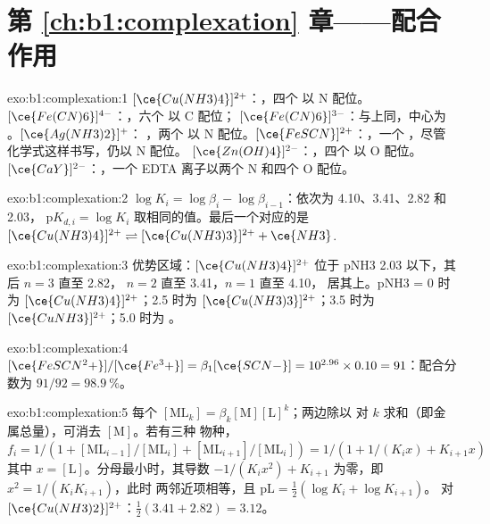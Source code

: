 \section*{第 \ref{ch:b1:complexation} 章——配合作用}

\begin{solution}{exo:b1:complexation:1}
$[\ce{Cu(NH3)4}]^{2+}$：，四个  以 N 配位。
$[\ce{Fe(CN)6}]^{4-}$：，六个  以 C 配位；
$[\ce{Fe(CN)6}]^{3-}$：与上同，中心为 。$[\ce{Ag(NH3)2}]^{+}$：
，两个  以 N 配位。$[\ce{FeSCN}]^{2+}$：，一个
，尽管化学式这样书写，仍以 N 配位。
$[\ce{Zn(OH)4}]^{2-}$：，四个  以 O 配位。
$[\ce{CaY}]^{2-}$：，一个 EDTA 离子以两个 N 和四个 O 配位。
\end{solution}

\begin{solution}{exo:b1:complexation:2}
$\log K_i = \log\beta_i - \log\beta_{i-1}$：依次为 4.10、3.41、2.82 和 2.03，
$\mathrm{p}K_{d,i} = \log K_i$ 取相同的值。最后一个对应的是
$[\ce{Cu(NH3)4}]^{2+} \rightleftharpoons [\ce{Cu(NH3)3}]^{2+} + \ce{NH3}$.
\end{solution}

\begin{solution}{exo:b1:complexation:3}
优势区域：$[\ce{Cu(NH3)4}]^{2+}$ 位于 pNH3 2.03 以下，其后 $n = 3$ 直至 2.82，
$n = 2$ 直至 3.41，$n = 1$ 直至 4.10， 居其上。pNH3 = 0 时为
$[\ce{Cu(NH3)4}]^{2+}$；2.5 时为 $[\ce{Cu(NH3)3}]^{2+}$；3.5 时为
$[\ce{CuNH3}]^{2+}$；5.0 时为 。
\end{solution}

\begin{solution}{exo:b1:complexation:4}
$[\ce{FeSCN^2+}]/[\ce{Fe^3+}] = \beta_1[\ce{SCN-}] = 10^{2.96} \times 0.10 =
91$：配合分数为 $91/92 = \qty{98.9}{\percent}$。
\end{solution}

\begin{solution}{exo:b1:complexation:5}
每个 $[\mathrm{ML}_k] = \beta_k[\mathrm{M}][\mathrm{L}]^k$；两边除以
对 $k$ 求和（即金属总量），可消去 $[\mathrm{M}]$。若有三种
物种，$f_i = 1/(1 + [\mathrm{ML}_{i-1}]/[\mathrm{ML}_i] +
[\mathrm{ML}_{i+1}]/[\mathrm{ML}_i]) = 1/(1 + 1/(K_i x) + K_{i+1}x)$ 其中
$x = [\mathrm{L}]$。分母最小时，其导数
$-1/(K_i x^2) + K_{i+1}$ 为零，即 $x^2 = 1/(K_iK_{i+1})$，此时
两邻近项相等，且 $\mathrm{pL} = \frac12(\log K_i + \log K_{i+1})$。
对 $[\ce{Cu(NH3)2}]^{2+}$：$\frac12(3.41 + 2.82) = 3.12$。
\end{solution}

